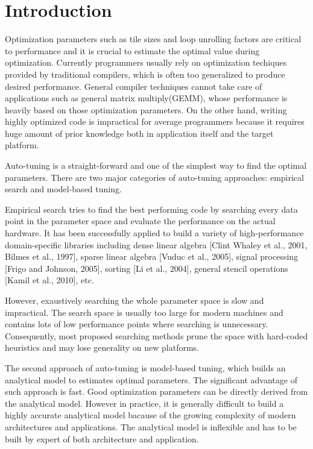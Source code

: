 \section{Introduction}
\label{sec:intro}


Optimization parameters such as tile sizes and loop unrolling factors are critical to performance and it
is crucial to estimate the optimal value during optimization.
Currently programmers usually rely on optimization techiques provided by traditional compilers, which
is often too generalized to produce desired performance.
General compiler techniques cannot take care of applications such as general matrix multiply(GEMM),
whose performance is heavily based on those optimization parameters.
On the other hand, writing highly optimized code is impractical for average
programmers because it requires huge amount of prior knowledge both in application
itself and the target platform.


\par

Auto-tuning is a straight-forward and one of the simplest way to find the optimal parameters.
There are two major categories of auto-tuning approaches: empirical search and model-based tuning.
\par
Empirical search tries to find the best performing code by searching every data point in
the parameter space and evaluate the performance on the actual hardware.
It has been successfully applied to build a variety
of high-performance domain-specific libraries including
dense linear algebra [Clint Whaley et al., 2001, Bilmes et al.,
1997], sparse linear algebra [Vuduc et al., 2005], signal processing
[Frigo and Johnson, 2005], sorting [Li et al., 2004],
general stencil operations [Kamil et al., 2010], etc.
\par
However, exaustively searching the whole parameter space is slow and impractical.
The search space is usually too large for modern machines and contains lots of low performance points where
searching is unnecessary. Consequently, most proposed searching methods
prune the space with hard-coded heuristics and may lose generality on new platforms.

\par
The second approach of auto-tuning is model-based tuning, which builds an analytical model
to estimates optimal parameters. The significant advantage of such approach is fast. Good optimization
parameters can be directly derived from the analytical model.
However in practice, it is generally difficult to build a highly accurate analytical model bacause of the growing complexity
of modern architectures and applications. The analytical model is inflexible and has to be built by expert of both architecture
and application.

